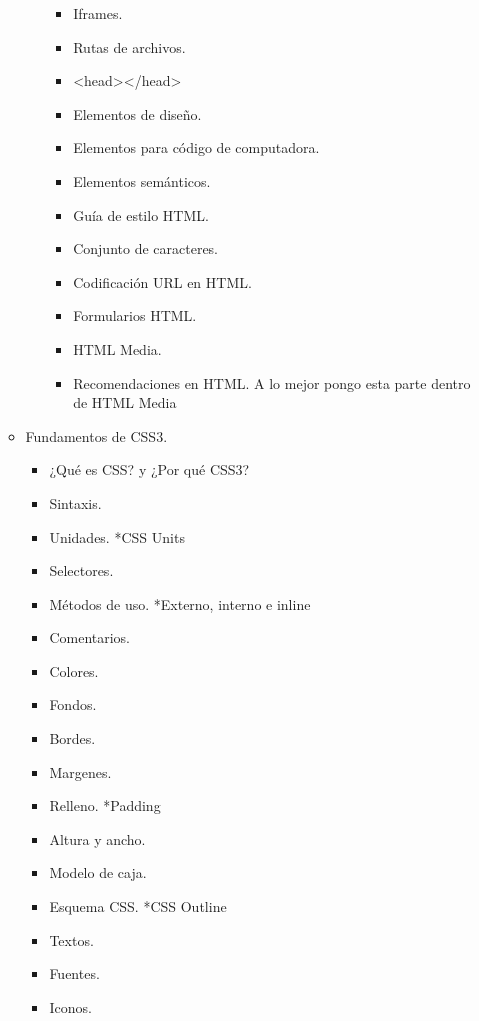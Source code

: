 \documentclass[12pt, letterpaper]{article}
\begin{document}
\begin{enumerate}
\begin{itemize}
\begin{enumerate}
\begin{itemize}
                \item Iframes.
                \item Rutas de archivos.
                \item <head></head>
                \item Elementos de diseño.
                \item Elementos para código de computadora.
                \item Elementos semánticos.
                \item Guía de estilo HTML.
                \item Conjunto de caracteres.
                \item Codificación URL en HTML.
                \item Formularios HTML.
                \item HTML Media.
                \item Recomendaciones en HTML. \newline*A lo mejor pongo esta parte dentro de HTML Media
            \end{itemize}
        \end{enumerate}
        \item Fundamentos de CSS3.
        \begin{itemize}
            \item ¿Qué es CSS? y ¿Por qué CSS3?
            \item Sintaxis.
            \item Unidades. *CSS Units
            \item Selectores.
            \item Métodos de uso. *Externo, interno e inline
            \item Comentarios.
            \item Colores.
            \item Fondos.
            \item Bordes.
            \item Margenes.
            \item Relleno. *Padding
            \item Altura y ancho.
            \item Modelo de caja.
            \item Esquema CSS. *CSS Outline
            \item Textos.
            \item Fuentes.
            \item Iconos.

\end{itemize}
\end{itemize}
\end{enumerate}
\end{document}
